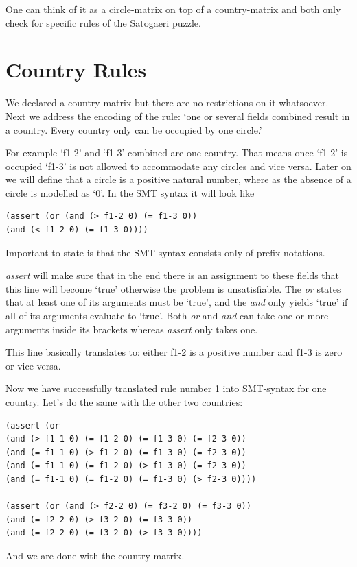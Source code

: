 One can think of it as a circle-matrix on top of a country-matrix and both only check for specific rules of the Satogaeri puzzle.

\section{Country Rules}
We declared a country-matrix but there are no restrictions on it whatsoever. Next we address the encoding of the rule: `one or several fields combined result in a country. Every country only can be occupied by one circle.'

For example `f1-2' and `f1-3' combined are one country. That means once `f1-2' is occupied `f1-3' is not allowed to accommodate any circles and vice versa. Later on we will define that a circle is a positive natural number, where as the absence of a circle is modelled as `0'. In the SMT syntax it will look like
\begin{lstlisting}
(assert (or (and (> f1-2 0) (= f1-3 0)) 
(and (< f1-2 0) (= f1-3 0))))
\end{lstlisting}
Important to state is that the SMT syntax consists only of prefix notations. 

\emph{assert} will make sure that in the end there is an assignment to these fields that this line will become `true' otherwise the problem is unsatisfiable. The \emph{or} states that at least one of its arguments must be `true', and the \emph{and} only yields `true' if all of its arguments evaluate to `true'. Both \emph{or} and \emph{and} can take one or more arguments inside its brackets whereas \emph{assert} only takes one.

This line basically translates to: either f1-2 is a positive number and f1-3 is zero or vice versa.

Now we have successfully translated rule number 1 into SMT-syntax for one country. Let's do the same with the other two countries:

\begin{lstlisting}
(assert (or 
(and (> f1-1 0) (= f1-2 0) (= f1-3 0) (= f2-3 0)) 
(and (= f1-1 0) (> f1-2 0) (= f1-3 0) (= f2-3 0)) 
(and (= f1-1 0) (= f1-2 0) (> f1-3 0) (= f2-3 0)) 
(and (= f1-1 0) (= f1-2 0) (= f1-3 0) (> f2-3 0))))

(assert (or (and (> f2-2 0) (= f3-2 0) (= f3-3 0)) 
(and (= f2-2 0) (> f3-2 0) (= f3-3 0)) 
(and (= f2-2 0) (= f3-2 0) (> f3-3 0))))
\end{lstlisting}
And we are done with the country-matrix.

